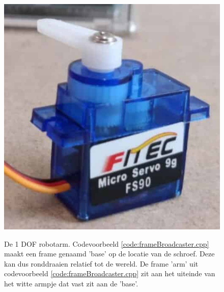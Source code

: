 \begin{figure}[ht]
\begin{center}
\includegraphics[scale=0.3]{Pictures/1DOFRobotarm.png}\\
\end{center}
\caption{De 1 DOF robotarm. Codevoorbeeld \ref{code:frameBroadcaster.cpp} maakt een frame genaamd 'base' op de locatie van de schroef. Deze kan dus ronddraaien relatief tot de wereld. De frame 'arm' uit codevoorbeeld \ref{code:frameBroadcaster.cpp} zit aan het uiteinde van het witte armpje dat vast zit aan de 'base'.}
\label{fig:1DOFRobotarm}
\end{figure}

